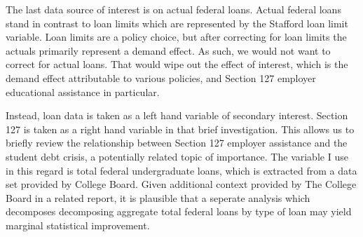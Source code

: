 \documentclass[review]{elsarticle}
\begin{document}

    The last data source of interest is on actual federal loans.
    Actual federal loans stand in contrast to loan limits which are represented by the Stafford loan limit variable.
    Loan limits are a policy choice, but after correcting for loan limits the actuals primarily represent a demand effect.
    As such, we would not want to correct for actual loans.
    That would wipe out the effect of interest,
    which is the demand effect attributable to various policies,
    and Section 127 employer educational assistance in particular.

    Instead, loan data is taken as a left hand variable of secondary interest.
    Section 127 is taken as a right hand variable in that brief investigation.
    This allows us to briefly review the relationship between Section 127 employer assistance
    and the student debt crisis, a potentially related topic of importance.
    The variable I use in this regard is total federal undergraduate loans,
    which is extracted from a data set provided by College Board\cite{cb_excel_2019}.
    Given additional context provided by The College Board in a related report\cite{cb_trends_2019},
    it is plausible that a seperate analysis which decomposes decomposing aggregate total federal loans by type of loan may yield marginal statistical improvement.
\end{document}
